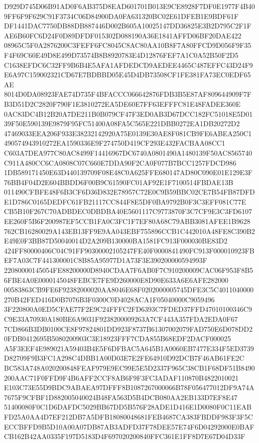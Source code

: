 \documentclass[UTF8,fontset=fandol,zihao=-4,a4paper]{ctexart}
\begin{document}
{{D929D745D06B91AD0F6AB375D8EAD601701B013E9CE8928F7DF0E1977F4B409FF6F9F629C91F3734C06D84900DA0FA631320BC02E61DFEB1E9BDF61F
DF1441DAC7750DB88DB887446D002B605A10025147DD36825E3B2D795C2F1FAE6B60FC6D24F0D89DFDF015302D088190A36E1841AFFD06BF20DAE422
08965C5F0A2876200C3FEFF6FC8045C8AC80AA10B8F7A80FFCD9D056F9F35F4F69C60E49D8E499D73574B8B8920783E4D12876FEF7A1C0A52B50F2D5
C1638EFDC6C32FF9B6B4E5AFA1AFDEDCD9AEDEE4465C487EFFC43D24F9E6A97C159002321CD67E7BDBBD05E45D4DB73508CF1FE381FA73EC0EDF65AE
8014D0DA08923FAE74D735F4BFACCC066642876FDB3B5E87AF809644909F7FB3D51D2C2820F790F1E3810272EA5DE60E7FF63EFFFC81E48FADEE360E
0AC83DC4B12B20A7DE211B0B079CF47F3ED0AB3D67DCC182FC51018E5D0139F50E590139E9879F95FC51400A08FA5C565E221DBB0272EA1DB20272D2
47469033EEA206F933E38232142920A75E0139E30AE8F081CB9FE6ABEA250C1490574943910272EA1590336E9F274750D419CF293E432FACBAA08CC1
C603A7DEA977C80AC8499F14416967DC6740A0801490A1480139F50AC8565740C911A480CC6CA0808C07C660E7DDA90F2CA0F077B7BCC1257FDCD986
1DB589171450E63D440139709F08E48C0A625FFE680147AD80C090E01E129E3F76BB4F04D2E604BBDD6F00B9C61590FC01AF92E1F7100514FBDAE13B
011490CFBFE48F6B3CF6D36D832E78957C72E0C9B59BBC02CE7B54FB87DFDE1D786C0165DEDFC61FB21117CC844F8E5DF0BA9792B0F3C3EFF081C77E
CB5B10F267C70ADBDEC0DBDBA40E5601117C9773870F3C7CF9E3C3FD6107EE260F5B6F200987EF5CCB1FA0C3FC1F7EF80A68C79ABB3081AFEE1B9628
762CB16280029A143EB13FF9E9AA043EBF755896CCB1C442010A48FE8C390B2E49E0F3BB87D50040014D2A209B130000BA1581FC913F000030BE83D2
424FF80000406C04C91FF90300002105247FE40F0000841490FC913F000010923FBEF7A03C7F441300001C8B85A95977D1A73F3E390200000594993F
22080000145054FE88200000D8940CDAA7F6AB0F7C910200009CAC06F953F8B56FBE4A0E0000145048FEBCE7FE9D260000E8D90E633A6E6AFE282000
00583863CB9FE6F92382000020AA8046E68F0202000005745DFE3C5C4011040000270B42FED416D0B7076B3F0300C0D4028ACA1F05040000C9059496
3F220800A0ED5CFAE77F2E9C24FFFC2FD6393C7FDED37FFD47010100346C9C9E33A70930A180BE6A9031F9238200009263A7CF443A357FDA2EDA0F67
7CD866B3DB0100CE8F97824801DD923F8737B61307002079FAD750E6D078DD20FDB0412695B5080200903C3E18923FFF7CDA855B68EDF2DACF000025
A5F3EEF4E989021A59403B4E5F6DFBAC5A645B1A0060EB7477E334F5ED3739D82709F9B3FC1A298C4DBB1A00D03E7E2FE64910D92DCB7F46AB61FE2C
BC583A748A020200848FEAF979E9EC99E5E5D2337F965C38CB1F68DF51B8490200AAC71F0FFD9F4B6AFF2CCF8AB6F9F3FC3ADAF110870B4822010021
E103C73E55D9BDC9ABAEA97DFFF8B1087267000066B78F056477012DF9A74A7675F9CFBF1D882005040024B48FA563D5B4DCB080AA2EB133D7EF8E47
51400080F0C1D6DAFDC5029BB67DD5B576F28ADE1D416E1D0080F0C11EABFD25A0AA4D7EF212DB7A5DFB18080048681FEB4687CA383FBDDF983F3F5C
ECCBFFD9B5D10A00A07DB87AB3ADFD37F78DEE57E74F6D04292000E0BAFCB162B42AA0335F197D5183D4F697020200840FFC361E1FF8D7E67D04D33F
}}
\end{document}
